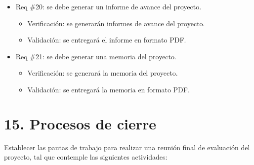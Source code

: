 \documentclass[
11pt%
]{charter}
\begin{document}
\begin{itemize}
\item Req \#20: se debe generar un informe de avance del proyecto.

\begin{itemize}
	\item Verificación: se generarán informes de avance del proyecto.
	\item Validación: se entregará el informe en formato PDF.
\end{itemize}

\item Req \#21: se debe generar una memoria del proyecto.

\begin{itemize}
	\item Verificación: se generará la memoria del proyecto.
	\item Validación: se entregará la memoria en formato PDF.
\end{itemize}

\end{itemize}


\section{15. Procesos de cierre}    
\label{sec:cierre}


Establecer las pautas de trabajo para realizar una reunión final de evaluación del proyecto, tal que contemple las siguientes actividades:
\end{document}
